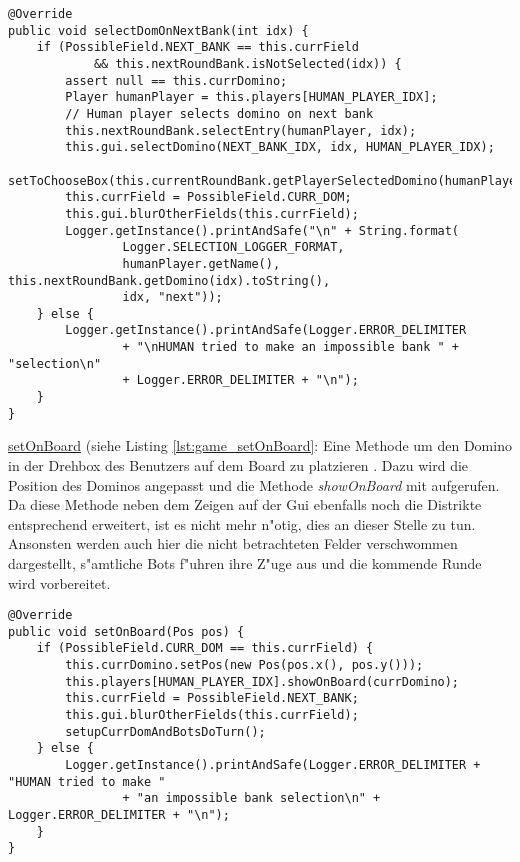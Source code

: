 \begin{lstlisting}[float,style=CodeHighlighting,caption=Game - selectDomOnNextBank,label=game_selectDomOnNextBank]
@Override
public void selectDomOnNextBank(int idx) {
    if (PossibleField.NEXT_BANK == this.currField 
    		&& this.nextRoundBank.isNotSelected(idx)) {
        assert null == this.currDomino;
        Player humanPlayer = this.players[HUMAN_PLAYER_IDX];
        // Human player selects domino on next bank
        this.nextRoundBank.selectEntry(humanPlayer, idx);
        this.gui.selectDomino(NEXT_BANK_IDX, idx, HUMAN_PLAYER_IDX);
        setToChooseBox(this.currentRoundBank.getPlayerSelectedDomino(humanPlayer));
        this.currField = PossibleField.CURR_DOM;
        this.gui.blurOtherFields(this.currField);
        Logger.getInstance().printAndSafe("\n" + String.format(
        		Logger.SELECTION_LOGGER_FORMAT,
                humanPlayer.getName(), this.nextRoundBank.getDomino(idx).toString(),
                idx, "next"));
    } else {
        Logger.getInstance().printAndSafe(Logger.ERROR_DELIMITER
                + "\nHUMAN tried to make an impossible bank " + "selection\n" 
                + Logger.ERROR_DELIMITER + "\n");
    }
}
\end{lstlisting}

\clearpage
\underline{setOnBoard} (siehe Listing \ref{lst:game_setOnBoard}: Eine Methode um den Domino in der Drehbox des Benutzers auf dem Board zu platzieren . Dazu wird die Position des Dominos angepasst und die Methode \emph{showOnBoard} mit aufgerufen. Da diese Methode neben dem Zeigen auf der Gui ebenfalls noch die Distrikte entsprechend erweitert, ist es nicht mehr n"otig, dies an dieser Stelle zu tun. Ansonsten werden auch hier die nicht betrachteten Felder verschwommen dargestellt, s"amtliche Bots f"uhren ihre Z"uge aus und die kommende Runde wird vorbereitet. 

\begin{lstlisting}[float,style=CodeHighlighting,caption=Game - setOnBoard,label=lst:game_setOnBoard]
@Override
public void setOnBoard(Pos pos) {
    if (PossibleField.CURR_DOM == this.currField) {
        this.currDomino.setPos(new Pos(pos.x(), pos.y()));
        this.players[HUMAN_PLAYER_IDX].showOnBoard(currDomino);
        this.currField = PossibleField.NEXT_BANK;
        this.gui.blurOtherFields(this.currField);
        setupCurrDomAndBotsDoTurn();
    } else {
        Logger.getInstance().printAndSafe(Logger.ERROR_DELIMITER + "HUMAN tried to make "
        		+ "an impossible bank selection\n" + Logger.ERROR_DELIMITER + "\n");
    }
}
\end{lstlisting}

